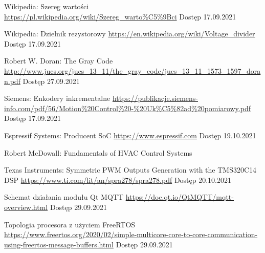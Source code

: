 \begin{thebibliography}{9}
        Wikipedia: Szereg wartości  \newline
        \url{https://pl.wikipedia.org/wiki/Szereg_warto\%C5\%9Bci} \newline
        Dostęp 17.09.2021
    
        Wikipedia: Dzielnik rezystorowy  \newline
        \url{https://en.wikipedia.org/wiki/Voltage\_divider} \newline
        Dostęp 17.09.2021
        
        Robert W. Doran: The Gray Code  \newline
        \url{http://www.jucs.org/jucs_13_11/the_gray_code/jucs_13_11_1573_1597_doran.pdf} \newline
        Dostęp 27.09.2021
        
        Siemens: Enkodery inkrementalne  \newline
        \url{https://publikacje.siemens-info.com/pdf/56/Motion\%20Control\%20-\%20Uk\%C5\%82ad\%20pomiarowy.pdf} \newline
        Dostęp 17.09.2021
        
        Espressif Systems: Producent SoC \newline
        \url{https://www.espressif.com}
        Dostęp 19.10.2021
  
        Robert McDowall: Fundamentals of HVAC Control Systems 
        
        Texas Instruments: Symmetric PWM Outputs Generation with the TMS320C14 DSP \newline
        \url{https://www.ti.com/lit/an/spra278/spra278.pdf}
        Dostęp 20.10.2021
        
        
        
        Schemat działania modułu Qt MQTT  \newline
        \url{https://doc.qt.io/QtMQTT/mqtt-overview.html} \newline
        Dostęp 29.09.2021        
         
        Topologia procesora z użyciem FreeRTOS  \newline
        \url{https://www.freertos.org/2020/02/simple-multicore-core-to-core-communication-using-freertos-message-buffers.html} \newline
        Dostęp 29.09.2021     
        

\end{thebibliography}
